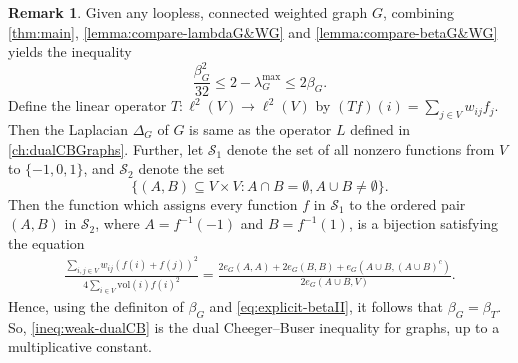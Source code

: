 \documentclass[12pt,a4paper,bold]{thesis}
\theoremstyle{definition}
\newtheorem{remark}[thm]{Remark}
\newcommand*{\map}[3]{#1 \colon #2 \to #3}
\newcommand{\vol}{\ensuremath{\mathrm{vol}}}
\begin{document}
\begin{remark}
    Given any loopless, connected weighted graph $G$, combining \cref{thm:main}, 
    \cref{lemma:compare-lambdaG&WG} and \cref{lemma:compare-betaG&WG} yields the inequality
    \begin{equation} \label{ineq:weak-dualCB}
        \frac{\beta_G^2}{32} \leq 2 - \lambda_G^{\max} \leq 2 \beta_G.
    \end{equation}
    Define the linear operator $\map{T}{\ell^2(V)}{\ell^2(V)}$ by 
    $(Tf)(i) = \sum_{j \in V} w_{ij} f_j$. Then the Laplacian $\Delta_G$ of $G$
    is same as the operator $L$ defined in \cref{ch:dualCBGraphs}. Further, 
    let $\mathcal{S}_1$ denote the set of all nonzero functions from $V$ to $\{-1,0,1\}$,
    and $\mathcal{S}_2$ denote the set 
    \begin{equation*}
        \{(A,B) \subseteq V \times V : A \cap B = \emptyset, A \cup B \neq \emptyset\}.
    \end{equation*}
    Then the function which assigns every function $f$ in $\mathcal{S}_1$ to 
    the ordered pair $(A,B)$ in $\mathcal{S}_2$, where $A = f^{-1}(-1)$ and $B = f^{-1}(1)$, 
    is a bijection satisfying the equation
    \begin{align*}
        \frac{\sum_{i,j \in V} w_{ij} (f(i) + f(j))^2}{4 \sum_{i \in V} \vol(i) f(i)^2}
        = 
        \frac{2 e_G(A,A) + 2 e_G(B,B) + e_G(A \cup B, (A \cup B)^c)}{2 e_G(A \cup B,V)}.
    \end{align*}
    Hence, using the definiton of $\beta_G$ and \cref{eq:explicit-betaII}, 
    it follows that $\beta_G = \beta_T$. So, \eqref{ineq:weak-dualCB} is 
    the dual Cheeger--Buser inequality for graphs, up to a multiplicative constant.
\end{remark}







\clearpage
{}
{}


\end{document}
